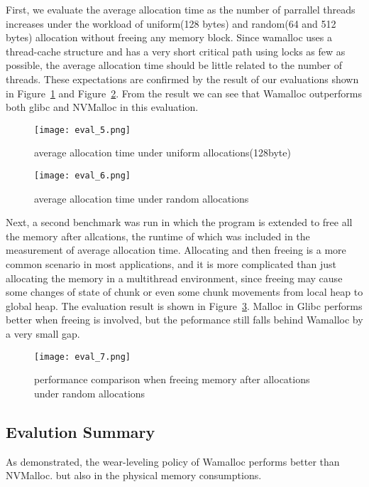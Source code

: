 \documentclass{vldb}
\begin{document}
First, we evaluate the average allocation time as the number of parrallel threads increases
under the workload of uniform(128 bytes) and random(64 and 512 bytes) allocation without freeing any memory block.
Since wamalloc uses a thread-cache structure and has a very short critical path using locks as few as possible,
the average allocation time should be little related to the number of threads.
These expectations are confirmed by the result of our evaluations shown in Figure~\ref{fig:eval_5} and Figure~\ref{fig:eval_6}.
From the result we can see that Wamalloc outperforms both glibc and NVMalloc in this evaluation.


\begin{figure}[t]
\centering
\texttt{[image: eval\_5.png]}
\caption{average allocation time under uniform allocations(128byte)}
\label{fig:eval_5}
\end{figure}

\begin{figure}[t]
\centering
\texttt{[image: eval\_6.png]}
\caption{average allocation time under random allocations}
\label{fig:eval_6}
\end{figure}

Next, a second benchmark was run in which the program is extended to free all the memory after allcations, the runtime of which was included in the measurement of average allocation time.
Allocating and then freeing is a more common scenario in most applications, and it is more complicated than just allocating the memory in a multithread environment,
since freeing may cause some changes of state of chunk or even some chunk movements from local heap to global heap.
The evaluation result is shown in Figure~\ref{fig:eval_7}.
Malloc in Glibc performs better when freeing is involved, but the peformance still falls behind Wamalloc by a very small gap.


\begin{figure}[t]
\centering
\texttt{[image: eval\_7.png]}
\caption{performance comparison when freeing memory after allocations under random allocations}
\label{fig:eval_7}
\end{figure}

\subsection{Evalution Summary}

As demonstrated, 
the wear-leveling policy of Wamalloc performs better than NVMalloc.
but also in the physical memory consumptions.
\end{document}
